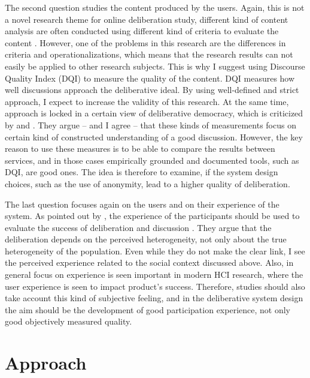\documentclass{article}
\begin{document}
The second question studies the content produced by the users. Again, this is not a novel research theme for online deliberation study, different kind of content analysis are often conducted using different kind of criteria to evaluate the content . However, one of the problems in this research are the differences in criteria and operationalizations, which means that the research results can not easily be applied to other research subjects. This is why I suggest using   Discourse Quality Index (DQI) to measure the quality of the content. DQI measures how well discussions approach the deliberative ideal. By using well-defined and strict approach, I expect to increase the validity of this research. At the same time,  approach is locked in a certain view of deliberative democracy, which is criticized by  and . They argue -- and I agree -- that these kinds of measurements focus on certain kind of constructed understanding of a good discussion. However, the key reason to use these measures is to be able to compare the results between services, and in those cases empirically grounded and documented tools, such as DQI, are good ones. The idea is therefore to examine, if the system design choices, such as the use of anonymity, lead to a higher quality of deliberation.

The last question focuses again on the users and on their experience of the system. As pointed out by , the experience of the participants should be used to evaluate the success of deliberation and discussion . They argue that the deliberation depends on the perceived heterogeneity, not only about the true heterogeneity of the population. Even while they do not make the clear link, I see the perceived experience related to the social context discussed above. Also, in general focus on experience is seen important in modern HCI research, where the user experience is seen to impact product's success. Therefore, studies should also take account this kind of subjective feeling, and in the deliberative system design the aim should be the development of good participation experience, not only good objectively measured quality.


\section{Approach}
\end{document}

